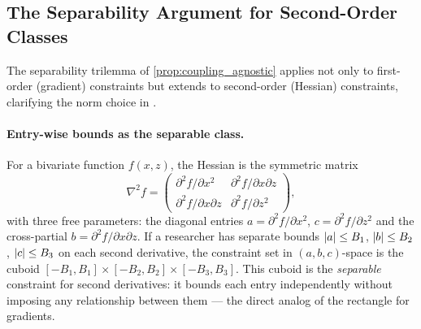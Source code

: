 \subsection{The Separability Argument for Second-Order Classes}\label{app:modulus:hessian_norms}

The separability trilemma of \cref{prop:coupling_agnostic} applies not only to first-order (gradient) constraints but extends to second-order (Hessian) constraints, clarifying the norm choice in \textcite{imbens_optimized_2019}.

\paragraph{Entry-wise bounds as the separable class.}
For a bivariate function $f(x,z)$, the Hessian is the symmetric matrix
\begin{equation*}
	\nabla^2 f = \begin{pmatrix} \partial^2 f / \partial x^2 & \partial^2 f / \partial x \partial z \\ \partial^2 f / \partial x \partial z & \partial^2 f / \partial z^2 \end{pmatrix},
\end{equation*}
with three free parameters: the diagonal entries $a = \partial^2 f / \partial x^2$, $c = \partial^2 f / \partial z^2$ and the cross-partial $b = \partial^2 f / \partial x \partial z$.
If a researcher has separate bounds $\lvert a\rvert \leq B_1$, $\lvert b\rvert \leq B_2$, $\lvert c\rvert \leq B_3$ on each second derivative, the constraint set in $(a,b,c)$-space is the cuboid $[-B_1, B_1] \times [-B_2, B_2] \times [-B_3, B_3]$.
This cuboid is the \emph{separable} constraint for second derivatives: it bounds each entry independently without imposing any relationship between them --- the direct analog of the rectangle for gradients.

